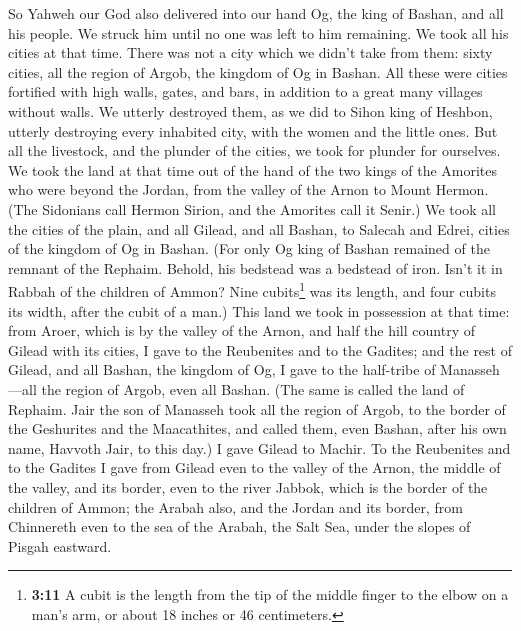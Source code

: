  So Yahweh our God also delivered into our hand Og, the
king of Bashan, and all his people. We struck him until no one was left
to him remaining.  We took all his cities at that time.
There was not a city which we didn't take from them: sixty cities, all
the region of Argob, the kingdom of Og in Bashan.  All
these were cities fortified with high walls, gates, and bars, in
addition to a great many villages without walls.  We
utterly destroyed them, as we did to Sihon king of Heshbon, utterly
destroying every inhabited city, with the women and the little ones.
 But all the livestock, and the plunder of the cities, we
took for plunder for ourselves.  We took the land at that
time out of the hand of the two kings of the Amorites who were beyond
the Jordan, from the valley of the Arnon to Mount Hermon. 
(The Sidonians call Hermon Sirion, and the Amorites call it Senir.)
 We took all the cities of the plain, and all Gilead, and
all Bashan, to Salecah and Edrei, cities of the kingdom of Og in Bashan.
 (For only Og king of Bashan remained of the remnant of
the Rephaim. Behold, his bedstead was a bedstead of iron. Isn't it in
Rabbah of the children of Ammon? Nine cubits\footnote{\textbf{3:11} A
  cubit is the length from the tip of the middle finger to the elbow on
  a man's arm, or about 18 inches or 46 centimeters.} was its length,
and four cubits its width, after the cubit of a man.) 
This land we took in possession at that time: from Aroer, which is by
the valley of the Arnon, and half the hill country of Gilead with its
cities, I gave to the Reubenites and to the Gadites;  and
the rest of Gilead, and all Bashan, the kingdom of Og, I gave to the
half-tribe of Manasseh---all the region of Argob, even all Bashan. (The
same is called the land of Rephaim.  Jair the son of
Manasseh took all the region of Argob, to the border of the Geshurites
and the Maacathites, and called them, even Bashan, after his own name,
Havvoth Jair, to this day.)  I gave Gilead to Machir.
 To the Reubenites and to the Gadites I gave from Gilead
even to the valley of the Arnon, the middle of the valley, and its
border, even to the river Jabbok, which is the border of the children of
Ammon;  the Arabah also, and the Jordan and its border,
from Chinnereth even to the sea of the Arabah, the Salt Sea, under the
slopes of Pisgah eastward.

